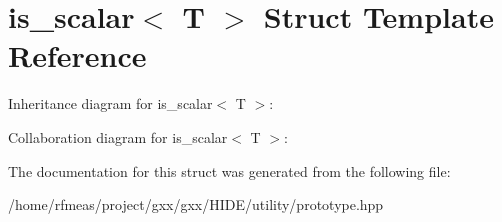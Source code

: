 \hypertarget{structis__scalar}{}\section{is\+\_\+scalar$<$ T $>$ Struct Template Reference}
\label{structis__scalar}


Inheritance diagram for is\+\_\+scalar$<$ T $>$\+:


Collaboration diagram for is\+\_\+scalar$<$ T $>$\+:


The documentation for this struct was generated from the following file\+:\begin{DoxyCompactItemize}
\item 
/home/rfmeas/project/gxx/gxx/\+H\+I\+D\+E/utility/prototype.\+hpp\end{DoxyCompactItemize}
